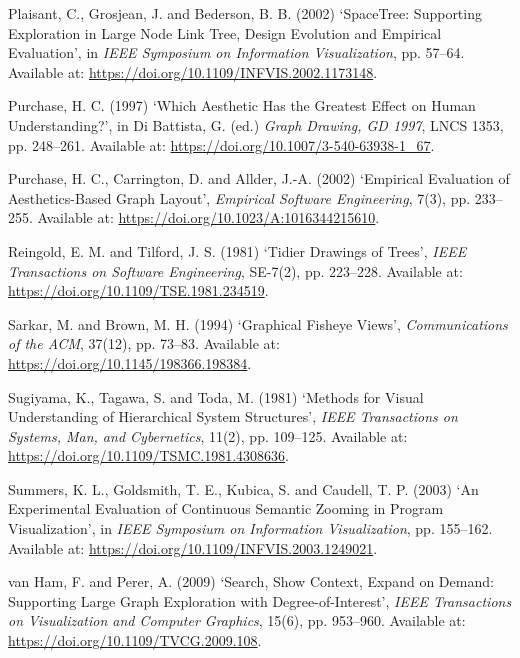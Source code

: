 \documentclass[11pt,a4paper,oneside,extrafontsizes]{memoir}
\begin{document}
Plaisant, C., Grosjean, J. and Bederson, B. B. (2002) ‘SpaceTree: Supporting Exploration in Large Node Link Tree, Design Evolution and Empirical Evaluation’, in \emph{IEEE Symposium on Information Visualization}, pp. 57–64. Available at: \href{https://doi.org/10.1109/INFVIS.2002.1173148}{https://doi.org/10.1109/INFVIS.2002.1173148}.

Purchase, H. C. (1997) ‘Which Aesthetic Has the Greatest Effect on Human Understanding?’, in Di Battista, G. (ed.) \emph{Graph Drawing, GD 1997}, LNCS 1353, pp. 248–261. Available at: \href{https://doi.org/10.1007/3-540-63938-1\_67}{https://doi.org/10.1007/3-540-63938-1\_67}.

Purchase, H. C., Carrington, D. and Allder, J.-A. (2002) ‘Empirical Evaluation of Aesthetics-Based Graph Layout’, \emph{Empirical Software Engineering}, 7(3), pp. 233–255. Available at: \href{https://doi.org/10.1023/A:1016344215610}{https://doi.org/10.1023/A:1016344215610}.

Reingold, E. M. and Tilford, J. S. (1981) ‘Tidier Drawings of Trees’, \emph{IEEE Transactions on Software Engineering}, SE-7(2), pp. 223–228. Available at: \href{https://doi.org/10.1109/TSE.1981.234519}{https://doi.org/10.1109/TSE.1981.234519}.

Sarkar, M. and Brown, M. H. (1994) ‘Graphical Fisheye Views’, \emph{Communications of the ACM}, 37(12), pp. 73–83. Available at: \href{https://doi.org/10.1145/198366.198384}{https://doi.org/10.1145/198366.198384}.

Sugiyama, K., Tagawa, S. and Toda, M. (1981) ‘Methods for Visual Understanding of Hierarchical System Structures’, \emph{IEEE Transactions on Systems, Man, and Cybernetics}, 11(2), pp. 109–125. Available at: \href{https://doi.org/10.1109/TSMC.1981.4308636}{https://doi.org/10.1109/TSMC.1981.4308636}.

Summers, K. L., Goldsmith, T. E., Kubica, S. and Caudell, T. P. (2003) ‘An Experimental Evaluation of Continuous Semantic Zooming in Program Visualization’, in \emph{IEEE Symposium on Information Visualization}, pp. 155–162. Available at: \href{https://doi.org/10.1109/INFVIS.2003.1249021}{https://doi.org/10.1109/INFVIS.2003.1249021}.

van Ham, F. and Perer, A. (2009) ‘Search, Show Context, Expand on Demand: Supporting Large Graph Exploration with Degree-of-Interest’, \emph{IEEE Transactions on Visualization and Computer Graphics}, 15(6), pp. 953–960. Available at: \href{https://doi.org/10.1109/TVCG.2009.108}{https://doi.org/10.1109/TVCG.2009.108}.
\end{document}
